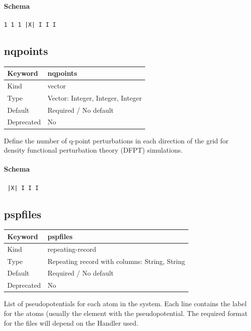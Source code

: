 \documentclass[11pt]{article}
\begin{document}
\paragraph{Schema}
\begin{Verbatim}
1 1 1 |X| I I I
\end{Verbatim}

\subsection{nqpoints}
\label{kw:nqpoints}
\begin{longtable}{|p{1.5in}|p{4.5in}|}
\hline
Keyword & nqpoints \\
\hline
Kind & vector \\
\hline
Type & Vector: Integer, Integer, Integer \\
\hline
Default & Required / No default \\
\hline
Deprecated & No \\
\hline
\end{longtable}
 Define the number of q-point perturbations in each direction of the grid for
 density functional perturbation theory (DFPT) simulations.

\paragraph{Schema}
\begin{Verbatim}
 |X| I I I
\end{Verbatim}

\subsection{pspfiles}
\label{kw:pspfiles}
\begin{longtable}{|p{1.5in}|p{4.5in}|}
\hline
Keyword & pspfiles \\
\hline
Kind & repeating-record \\
\hline
Type & Repeating record with columns: String, String \\
\hline
Default & Required / No default \\
\hline
Deprecated & No \\
\hline
\end{longtable}
 List of pseudopotentials for each atom in the system. Each line contains
 the label for the atoms (usually the element %
 with the pseudopotential. The required format for the files will depend on the
 Handler used.
\end{document}
